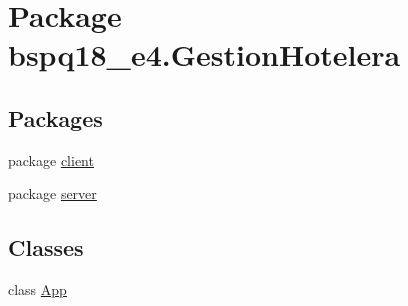 \hypertarget{namespacebspq18__e4_1_1_gestion_hotelera}{}\section{Package bspq18\+\_\+e4.\+Gestion\+Hotelera}
\label{namespacebspq18__e4_1_1_gestion_hotelera}
\subsection*{Packages}
\begin{DoxyCompactItemize}
\item 
package \mbox{\hyperlink{namespacebspq18__e4_1_1_gestion_hotelera_1_1client}{client}}
\item 
package \mbox{\hyperlink{namespacebspq18__e4_1_1_gestion_hotelera_1_1server}{server}}
\end{DoxyCompactItemize}
\subsection*{Classes}
\begin{DoxyCompactItemize}
\item 
class \mbox{\hyperlink{classbspq18__e4_1_1_gestion_hotelera_1_1_app}{App}}
\end{DoxyCompactItemize}
